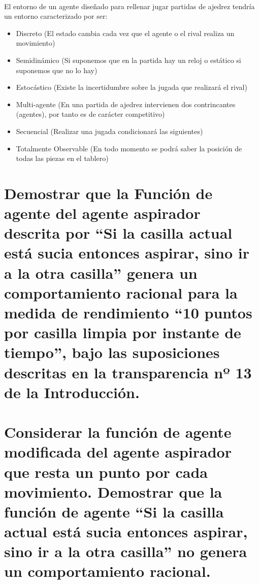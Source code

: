 \documentclass[10pt, a4paper,spanish]{article}
\begin{document}
		\paragraph{}
		El entorno de un agente diseñado para rellenar jugar partidas de ajedrez tendría un entorno caracterizado por ser:

		\begin{itemize}
			\item Discreto (El estado cambia cada vez que el agente o el rival realiza un movimiento)
			\item Semidinámico (Si suponemos que en la partida hay un reloj o estático si suponemos que no lo hay)
			\item Estocástico (Existe la incertidumbre sobre la jugada que realizará el rival)
			\item Multi-agente (En una partida de ajedrez intervienen dos contrincantes (agentes), por tanto es de carácter competitivo)
			\item Secuencial (Realizar una jugada condicionará las siguientes)
			\item Totalmente Observable (En todo momento se podrá saber la posición de todas las piezas en el tablero)
		\end{itemize}


	\section{Demostrar que la Función de agente del agente aspirador descrita por “Si la casilla actual está sucia entonces aspirar, sino ir a la otra casilla” genera un comportamiento racional para la medida de rendimiento “10 puntos por casilla limpia por instante de tiempo”, bajo las suposiciones descritas en la transparencia nº 13 de la Introducción.}

		\paragraph{}



	\section{Considerar la función de agente modificada del agente aspirador que resta un punto por cada movimiento. Demostrar que la función de agente “Si la casilla actual está sucia entonces aspirar, sino ir a la otra casilla” no genera un comportamiento racional.}
\end{document}
